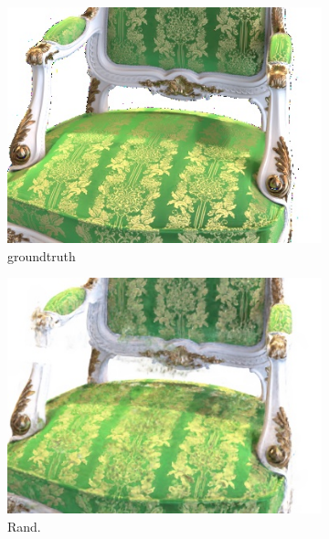 \begin{figure}[ht!]
    \centering
      \begin{subfigure}{0.19\textwidth}
        \centering   
        \includegraphics[width=\linewidth]{figs/gt_chair.jpg}
          \caption{groundtruth}
          \label{fig:sub1}
      \end{subfigure}   %
      \begin{subfigure}{0.19\textwidth}
        \centering   
        \includegraphics[width=\linewidth]{figs/random_chair.jpg}
          \caption{Rand.}
          \label{fig:sub2}
      \end{subfigure}
      \begin{subfigure}{0.19\textwidth}

\end{subfigure}
\end{figure}
